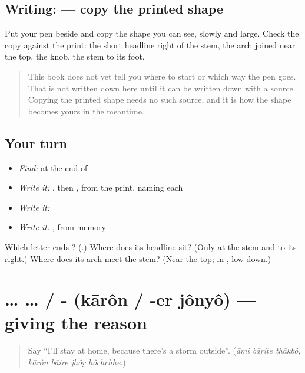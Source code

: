 \subsection*{Writing:  — copy the printed shape}
Put your pen beside \textbf{} and copy the shape you can see, slowly and large. Check the copy against the print: the short headline right of the stem, the arch joined near the top, the knob, the stem to its foot.

\begin{quote}
This book does not yet tell you where to start  or which way the pen goes. That is not written down here until it can be written down with a source. Copying the printed shape needs no such source, and it is how the shape becomes yours in the meantime.
\end{quote}

\subsection*{Your turn}
\begin{itemize}
\raggedright
  \item \emph{Find:}  at the end of \textbf{}
  \item \emph{Write it:} , then , from the print, naming each
  \item \emph{Write it:} \textbf{}
  \item \emph{Write it:} \textbf{}, from memory
\end{itemize}

\begin{tcolorbox}[breakable,colback=teal!4,colframe=teal!35!black,title={Before you move on}]
Which letter ends \textbf{}? (\textbf{}.) Where does its headline sit? (Only at the stem and to its right.) Where does its arch meet the stem? (Near the top; in \textbf{}, low down.)
\end{tcolorbox}
\section[\texorpdfstring{… \bn{কারণ} … / -\bn{এর} \bn{জন্য} (… kārôn … / -er …)}{… কারণ … / -এর জন্য (… kārôn … / -er …)}]{…  … / -  (kārôn / -er jônyô) — giving the reason}

\label{lesson:BN-C268-karon-jonno}



\begin{quote}
Say \textquotedblleft{}I'll stay at home, because there's a storm outside\textquotedblright{}. (\emph{āmi bāṛite thākbô, kārôn bāire jhôṛ hôchchhe}.)
\end{quote}

